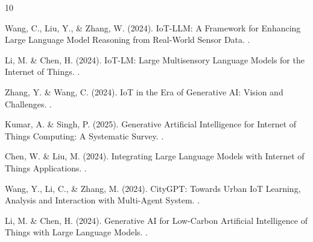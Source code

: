 \documentclass[12pt,a4paper]{article}
\begin{document}

\begin{thebibliography}{10}

Wang, C., Liu, Y., \& Zhang, W. (2024).
\newblock IoT-LLM: A Framework for Enhancing Large Language Model Reasoning from Real-World Sensor Data.
.

Li, M. \& Chen, H. (2024).
\newblock IoT-LM: Large Multisensory Language Models for the Internet of Things.
.

Zhang, Y. \& Wang, C. (2024).
\newblock IoT in the Era of Generative AI: Vision and Challenges.
.

Kumar, A. \& Singh, P. (2025).
\newblock Generative Artificial Intelligence for Internet of Things Computing: A Systematic Survey.
.

Chen, W. \& Liu, M. (2024).
\newblock Integrating Large Language Models with Internet of Things Applications.
.

Wang, Y., Li, C., \& Zhang, M. (2024).
\newblock CityGPT: Towards Urban IoT Learning, Analysis and Interaction with Multi-Agent System.
.

Li, M. \& Chen, H. (2024).
\newblock Generative AI for Low-Carbon Artificial Intelligence of Things with Large Language Models.
.

\end{thebibliography}
\end{document}
